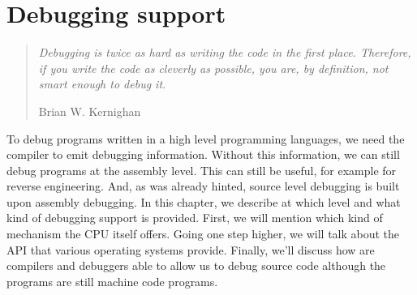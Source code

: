 \chapter{Debugging support}

\begin{quote}
  \textit{Debugging is twice as hard as writing the code in the first place.
    Therefore, if you write the code as cleverly as possible, you are, by
    definition, not smart enough to debug it.}\begin{flushright}
    \tiny{Brian W. Kernighan}
  \end{flushright}
\end{quote}

To debug programs written in a high level programming languages, we need the
compiler to emit debugging information. Without this information, we can still
debug programs at the assembly level. This can still be useful, for example for
reverse engineering. And, as was already hinted, source level debugging is
built upon assembly debugging. In this chapter, we describe at which level and
what kind of debugging support is provided. First, we will mention which kind
of mechanism the CPU itself offers. Going one step higher, we will talk about
the API that various operating systems provide. Finally, we'll discuss how are
compilers and debuggers able to allow us to debug source code although the
programs are still machine code programs. 

